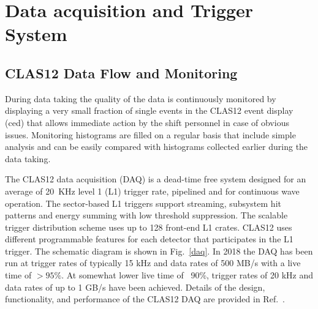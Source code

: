 \documentclass[final,3p,times,twocolumn,authoryear]{elsarticle}
\begin{document}



\section{Data acquisition and Trigger System} 

\subsection {\rm CLAS12 Data Flow and Monitoring} 
During data taking the quality of the data is continuously monitored by displaying a very small fraction of single events in 
 the CLAS12 event display (ced) that allows immediate action by the shift personnel in case of obvious issues. Monitoring
 histograms are filled on a regular basis that include simple analysis and can be easily compared with histograms 
 collected earlier during the data taking.  

The CLAS12 data acquisition (DAQ) is a dead-time free system designed for an average of 20~KHz level 1 (L1) 
trigger rate, pipelined and for continuous wave operation. The sector-based  L1 triggers support streaming, subsystem 
hit patterns and energy summing with low threshold suppression.  The scalable trigger distribution scheme 
uses up to 128 front-end L1 crates. CLAS12 uses different programmable features for each detector that 
participates in the L1 trigger. The schematic diagram is shown in Fig.~\ref{daq}. In 2018 the DAQ has been run 
at trigger rates of typically 15 kHz and data rates of 500 MB/s with a live time of $> 95\%$. At somewhat 
lower live time of ~90\%, trigger rates of 20 kHz and data rates of up to 1 GB/s have been achieved.
Details of the design, functionality, and performance of the CLAS12 DAQ are provided in  Ref.~\cite{DAQ}. 
 
\end{document}
